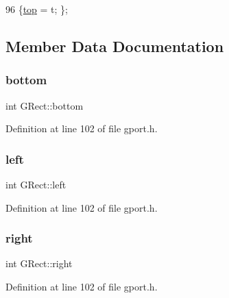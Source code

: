 \begin{DoxyCode}
96 \{\mbox{\hyperlink{class_g_rect_af22c8a22a7d2fe0f139375e7eb171675}{top}} = t; \};
\end{DoxyCode}


\subsection{Member Data Documentation}
\mbox{\label{class_g_rect_a767f1eb55f7e9880f58609406b2d6a66}} 
\subsubsection{\texorpdfstring{bottom}{bottom}}
{\footnotesize\ttfamily int G\+Rect\+::bottom\hspace{0.3cm}{\ttfamily [protected]}}



Definition at line 102 of file gport.\+h.

\mbox{\label{class_g_rect_ab848c49d0c6376f749a592042791b98b}} 
\subsubsection{\texorpdfstring{left}{left}}
{\footnotesize\ttfamily int G\+Rect\+::left\hspace{0.3cm}{\ttfamily [protected]}}



Definition at line 102 of file gport.\+h.

\mbox{\label{class_g_rect_a361868c6c368e642abcaf3e4823b1e70}} 
\subsubsection{\texorpdfstring{right}{right}}
{\footnotesize\ttfamily int G\+Rect\+::right\hspace{0.3cm}{\ttfamily [protected]}}



Definition at line 102 of file gport.\+h.

\mbox{\label{class_g_rect_af22c8a22a7d2fe0f139375e7eb171675}} 
